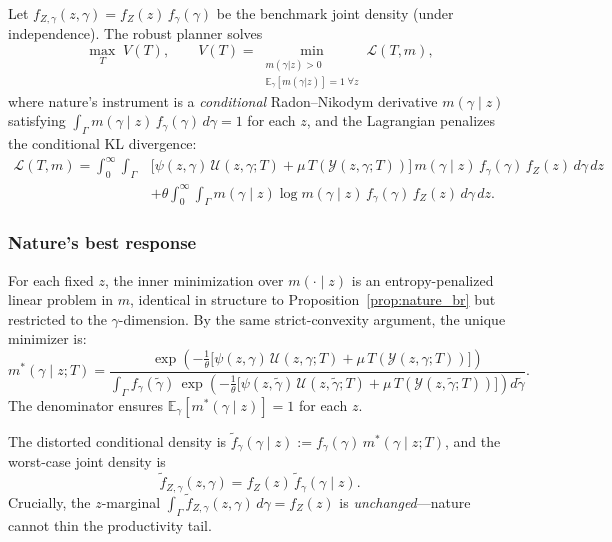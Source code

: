 \documentclass[12pt,a4paper]{article}
\theoremstyle{definition}
\theoremstyle{plain}
\theoremstyle{remark}
\newcommand{\E}{\mathbb{E}}
\newcommand{\calU}{\mathcal{U}}
\newcommand{\calL}{\mathcal{L}}
\newcommand{\calY}{\mathcal{Y}}
\begin{document}
Let $f_{Z,\gamma}(z,\gamma) = f_Z(z)\,f_{\gamma}(\gamma)$ be the benchmark joint density (under independence).  The robust planner solves
\[
  \max_T\; V(T), \qquad V(T) = \min_{\substack{m(\gamma|z) > 0 \\ \E_{\gamma}[m(\gamma|z)] = 1\;\forall z}} \calL(T,m),
\]
where nature's instrument is a \emph{conditional} Radon--Nikodym derivative $m(\gamma \mid z)$ satisfying $\int_{\Gamma} m(\gamma \mid z)\,f_{\gamma}(\gamma)\,d\gamma = 1$ for each $z$, and the Lagrangian penalizes the conditional KL divergence:
\begin{equation}
\label{eq:L_2D_conditional}
\begin{split}
  \calL(T,m) = \int_0^{\infty}\int_{\Gamma} &\bigl[\psi(z,\gamma)\,\calU(z,\gamma;T) + \mu\,T(\calY(z,\gamma;T))\bigr]\,m(\gamma \mid z)\,f_{\gamma}(\gamma)\,f_Z(z)\,d\gamma\,dz \\
  &+ \theta \int_0^{\infty}\int_{\Gamma} m(\gamma \mid z)\log m(\gamma \mid z)\,f_{\gamma}(\gamma)\,f_Z(z)\,d\gamma\,dz.
\end{split}
\end{equation}

\subsubsection{Nature's best response}

For each fixed $z$, the inner minimization over $m(\cdot \mid z)$ is an entropy-penalized linear problem in $m$, identical in structure to Proposition~\ref{prop:nature_br} but restricted to the $\gamma$-dimension.  By the same strict-convexity argument, the unique minimizer is:
\begin{equation}
\label{eq:m_conditional_2D}
  m^*(\gamma \mid z;T) = \frac{\exp\!\left(-\frac{1}{\theta}\bigl[\psi(z,\gamma)\,\calU(z,\gamma;T) + \mu\,T(\calY(z,\gamma;T))\bigr]\right)}
  {\int_{\Gamma} f_{\gamma}(\tilde\gamma)\,\exp\!\left(-\frac{1}{\theta}\bigl[\psi(z,\tilde\gamma)\,\calU(z,\tilde\gamma;T) + \mu\,T(\calY(z,\tilde\gamma;T))\bigr]\right)d\tilde\gamma}.
\end{equation}
The denominator ensures $\E_{\gamma}[m^*(\gamma \mid z)] = 1$ for each $z$.

The distorted conditional density is $\widetilde{f}_{\gamma}(\gamma \mid z) := f_{\gamma}(\gamma)\,m^*(\gamma \mid z;T)$, and the worst-case joint density is
\begin{equation}
\label{eq:f_tilde_conditional_2D}
  \widetilde{f}_{Z,\gamma}(z,\gamma) = f_Z(z)\,\widetilde{f}_{\gamma}(\gamma \mid z).
\end{equation}
Crucially, the $z$-marginal $\int_{\Gamma}\widetilde{f}_{Z,\gamma}(z,\gamma)\,d\gamma = f_Z(z)$ is \emph{unchanged}---nature cannot thin the productivity tail.
\end{document}
